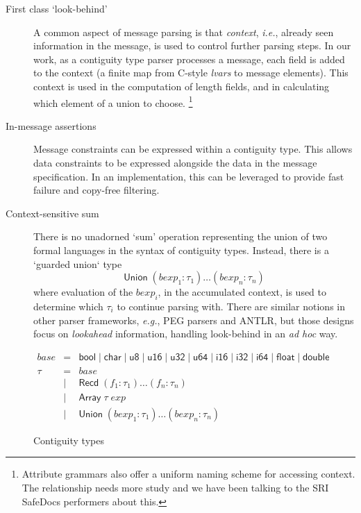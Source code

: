 \documentclass{article}
\newcommand{\ie}{\textit{i.e.}}
\newcommand{\eg}{\textit{e.g.}}
\newcommand{\adhoc}{\textit{ad hoc}}
\newcommand{\konst}[1]{\ensuremath{\mathsf{#1}}}
\theoremstyle{definition}
\begin{document}
\begin{description}

\item [First class `look-behind'] A common aspect of message parsing
  is that \emph{context}, \ie, already seen information in the
  message, is used to control further parsing steps. In our work, as a
  contiguity type parser processes a message, each field is added to
  the context (a finite map from C-style \emph{lvars} to message
  elements). This context is used in the computation of length fields,
  and in calculating which element of a union to
  choose. \footnote{Attribute grammars also offer a uniform naming
    scheme for accessing context. The relationship needs more study
    and we have been talking to the SRI SafeDocs performers about
    this.}

\item [In-message assertions] Message constraints can be expressed
  within a contiguity type. This allows data constraints to be
  expressed alongside the data in the message specification. In an
  implementation, this can be leveraged to provide fast failure and
  copy-free filtering.

\item [Context-sensitive sum] There is no unadorned `sum' operation
  representing the union of two formal languages in the syntax of
  contiguity types. Instead, there is a `guarded union` type
  \[
    \konst{Union}\; (\mathit{bexp}_1 : \tau_1) \ldots (\mathit{bexp}_n : \tau_n)
  \]
  where evaluation of the $\mathit{bexp}_i$, in the accumulated
  context, is used to determine which $\tau_i$ to continue parsing
  with. There are similar notions in other parser frameworks, \eg, PEG
  parsers and ANTLR, but those designs focus on \emph{lookahead}
  information, handling look-behind in an \adhoc{} way.

\end{description}


\begin{figure}
\[
\begin{array}{rcl}
 \mathit{base} & = & \konst{bool} \mid \konst{char} \mid \konst{u8} \mid
 \konst{u16} \mid \konst{u32} \mid \konst{u64}  \mid \konst{i16} \mid
 \konst{i32} \mid \konst{i64} \mid \konst{float} \mid \konst{double} \\
 \tau & = & \mathit{base} \\
      & \mid & \konst{Recd}\; (f_1 : \tau_1) \ldots (f_n : \tau_n) \\
      & \mid & \konst{Array}\; \tau \; \mathit{exp} \\
      & \mid & \konst{Union}\; (\mathit{bexp}_1 : \tau_1) \ldots (\mathit{bexp}_n : \tau_n)
\end{array}
\]
\caption{Contiguity types}
\label{ctypes}
\end{figure}
\end{document}
